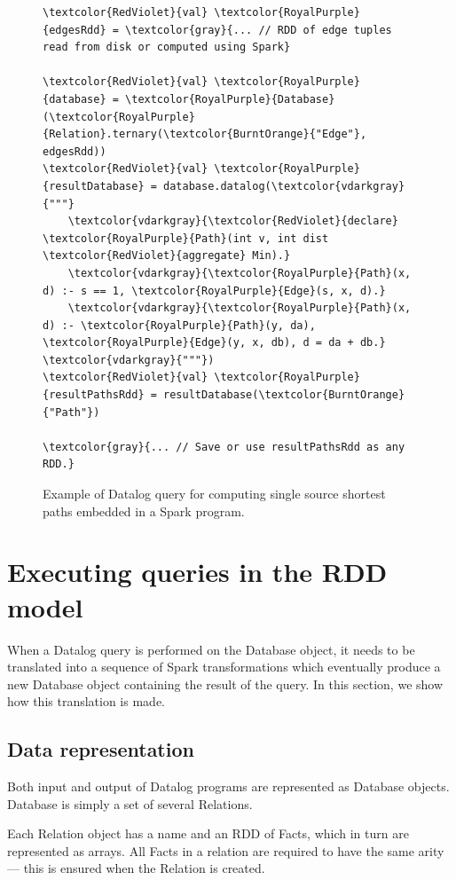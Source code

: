 \begin{figure}[!htbp]
  \centering
\begin{Verbatim}
\textcolor{RedViolet}{val} \textcolor{RoyalPurple}{edgesRdd} = \textcolor{gray}{... // RDD of edge tuples read from disk or computed using Spark}

\textcolor{RedViolet}{val} \textcolor{RoyalPurple}{database} = \textcolor{RoyalPurple}{Database}(\textcolor{RoyalPurple}{Relation}.ternary(\textcolor{BurntOrange}{"Edge"}, edgesRdd))
\textcolor{RedViolet}{val} \textcolor{RoyalPurple}{resultDatabase} = database.datalog(\textcolor{vdarkgray}{"""}
    \textcolor{vdarkgray}{\textcolor{RedViolet}{declare} \textcolor{RoyalPurple}{Path}(int v, int dist \textcolor{RedViolet}{aggregate} Min).}
    \textcolor{vdarkgray}{\textcolor{RoyalPurple}{Path}(x, d) :- s == 1, \textcolor{RoyalPurple}{Edge}(s, x, d).}
    \textcolor{vdarkgray}{\textcolor{RoyalPurple}{Path}(x, d) :- \textcolor{RoyalPurple}{Path}(y, da), \textcolor{RoyalPurple}{Edge}(y, x, db), d = da + db.}
\textcolor{vdarkgray}{"""})
\textcolor{RedViolet}{val} \textcolor{RoyalPurple}{resultPathsRdd} = resultDatabase(\textcolor{BurntOrange}{"Path"})

\textcolor{gray}{... // Save or use resultPathsRdd as any RDD.}
\end{Verbatim}
  \caption{Example of Datalog query for computing single source shortest paths embedded in a Spark program.\label{sdinspark}}
\end{figure}
\section{Executing \datalogra queries in the RDD model}

When a Datalog query is performed on the Database object, it needs to be translated into a sequence of Spark transformations which eventually produce a new Database object containing the result of the query. In this section, we show how this translation is made.

\subsection{Data representation}

Both input and output of Datalog programs are represented as Database objects. Database is simply a set of several Relations.

Each Relation object has a name and an RDD of Facts, which in turn are represented as arrays. All Facts in a relation are required to have the same arity --- this is ensured when the Relation is created.

